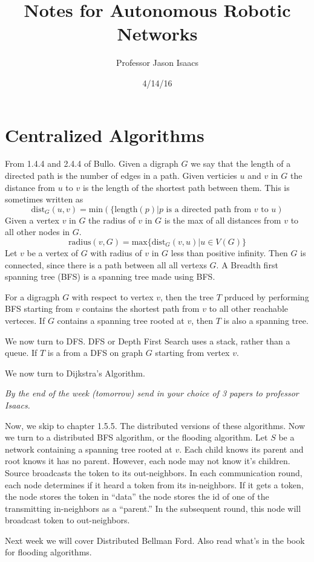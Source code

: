 \documentclass{article}
\title{Notes for Autonomous Robotic Networks}
\author{Professor Jason Isaacs}
\date{4/14/16}
\begin{document}
\maketitle
\section{Centralized Algorithms}
From 1.4.4 and 2.4.4 of Bullo. Given a digraph $G$ we say that the length of a
directed path is the number of edges in a path. Given verticies $u$ and $v$ in
$G$ the distance from $u$ to $v$ is the length of the shortest path between
them. This is sometimes written as 
\[ \text{dist}_{G}(u,v)  = \text{min}(\{\text{length}(p)|p \text{ is a directed
path from }v\text{ to }u) \]
Given a vertex $v$ in $G$ the radius of $v$ in $G$ is the max of all  distances
from $v$ to all other nodes in $G$. 
\[ \text{radius}(v,G) = \text{max}\{\text{dist}_G(v,u)|u\in V(G)\} \]
Let $v$ be a vertex of $G$ with radius of $v$ in $G$ less than positive
infinity. Then $G$ is connected, since there is a path between all all vertexs
$G$. A Breadth first spanning tree (BFS) is a spanning tree made using BFS\@. 

For a digragph $G$ with respect to vertex $v$, then the tree $T$ prduced by
performing BFS starting from $v$ contains the shortest path from $v$ to all
other reachable verteces. If $G$ contains a spanning tree rooted at $v$, then
$T$ is also a spanning tree. 

We now turn to DFS\@. DFS or Depth First Search uses a stack, rather than a
queue. If $T$ is a from a DFS on graph $G$ starting from vertex $v$. 

We now turn to Dijkstra's Algorithm. 

\emph{By the end of the week (tomorrow) send in your choice of 3 papers to
professor Isaacs.} 

Now, we skip to chapter 1.5.5. The distributed versions of these algorithms. Now
we turn to a distributed BFS algorithm, or the flooding algorithm. Let $S$ be a
network containing a spanning tree rooted at $v$. Each child knows its parent
and root knows it has no parent. However, each node may not know it's children. 
Source broadcasts the token to its out-neighbors. In each communication round,
each node determines if it heard a token from its in-neighbors. If it gets a
token, the node stores the token in ``data'' the node stores the id of one of
the transmitting in-neighbors as a ``parent.'' In the subsequent round, this
node will broadcast token to out-neighbors. 

Next week we will cover Distributed Bellman Ford. Also read what's in the book
for flooding algorithms. 
\end{document}
